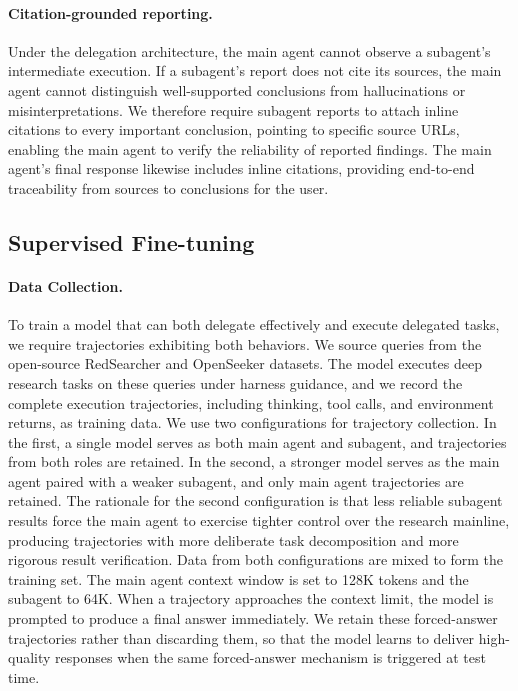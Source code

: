 \documentclass[table]{gtech}
\begin{document}
\paragraph{Citation-grounded reporting.}
Under the delegation architecture, the main agent cannot observe a subagent's intermediate execution. If a subagent's report does not cite its sources, the main agent cannot distinguish well-supported conclusions from hallucinations or misinterpretations. We therefore require subagent reports to attach inline citations to every important conclusion, pointing to specific source URLs, enabling the main agent to verify the reliability of reported findings. The main agent's final response likewise includes inline citations, providing end-to-end traceability from sources to conclusions for the user.

\subsection{Supervised Fine-tuning}

\paragraph{Data Collection.}
To train a model that can both delegate effectively and execute delegated tasks, we require trajectories exhibiting both behaviors. We source queries from the open-source RedSearcher \citep{chu2026redsearcher} and OpenSeeker \citep{du2026openseeker} datasets. The model executes deep research tasks on these queries under harness guidance, and we record the complete execution trajectories, including thinking, tool calls, and environment returns, as training data. We use two configurations for trajectory collection. In the first, a single model serves as both main agent and subagent, and trajectories from both roles are retained. In the second, a stronger model serves as the main agent paired with a weaker subagent, and only main agent trajectories are retained. The rationale for the second configuration is that less reliable subagent results force the main agent to exercise tighter control over the research mainline, producing trajectories with more deliberate task decomposition and more rigorous result verification. Data from both configurations are mixed to form the training set. The main agent context window is set to 128K tokens and the subagent to 64K. When a trajectory approaches the context limit, the model is prompted to produce a final answer immediately. We retain these forced-answer trajectories rather than discarding them, so that the model learns to deliver high-quality responses when the same forced-answer mechanism is triggered at test time.
\end{document}
